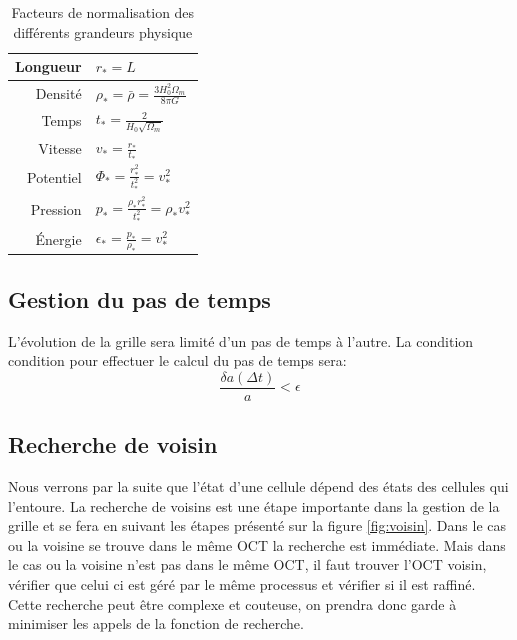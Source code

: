\begin{table}[htbp]
\begin{center}
\begin{tabular}{r l} \hline 
Longueur  & $r_*=L$\\ \hline 
Densité & $\rho_* = \bar{\rho} = \frac{3H_0^2 \Omega_m}{8\pi G}$\\ \hline 
Temps & $t_* = \frac{2}{H_0 \sqrt{\Omega_m}}$\\ \hline 
Vitesse & $v_* = \frac{r_*}{t_*}$\\ \hline 
Potentiel & $\Phi_* = \frac{r_*^2}{t_*^2} = v_*^2$\\ \hline 
Pression & $p_* = \frac{\rho_* r_*^2}{t_*^2} = \rho_* v_*^2$\\ \hline 
Énergie & $\epsilon_* = \frac{p_*}{\rho_*} = v_*^2$\\ \hline 
\end{tabular} 
\end{center}

\caption{Facteurs de normalisation des différents grandeurs physique} 
\end{table}

\subsection{Gestion du pas de temps}
L'évolution de la grille sera limité d'un pas de temps à l'autre.
La condition condition pour effectuer le calcul du pas de temps sera:
\begin{equation}
\frac{\delta a (\Delta t) } {a} < \epsilon
\end{equation}

\subsection{Recherche de voisin}
Nous verrons par la suite que l'état d'une cellule dépend des états des cellules qui l'entoure.
La recherche de voisins est une étape importante dans la gestion de la grille et se fera en suivant les étapes présenté sur la figure \ref{fig:voisin}.
Dans le cas ou la voisine se trouve dans le même OCT la recherche est immédiate.
Mais dans le cas ou la voisine n'est pas dans le même OCT, il faut trouver l'OCT voisin, vérifier que celui ci est géré par le même processus et vérifier si il est raffiné.
Cette recherche peut être complexe et couteuse, on prendra donc garde à minimiser les appels de la fonction de recherche. 

